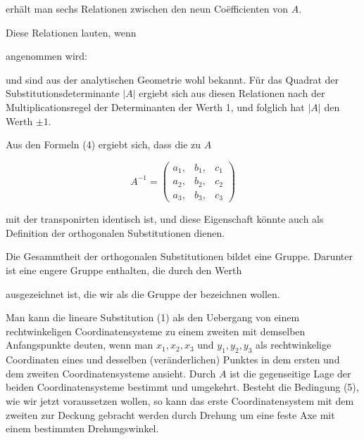 erh\"alt man sechs Relationen zwischen den neun Coëfficienten
von $A$.

Diese Relationen lauten, wenn


angenommen wird:


und sind aus der analytischen Geometrie wohl bekannt. F\"ur das
Quadrat der Substitutionsdeterminante $|A|$ ergiebt sich aus diesen
Relationen nach der Multiplicationsregel der Determinanten der
Werth 1, und folglich hat $|A|$ den Werth $\pm 1$.

Aus den Formeln (4) ergiebt sich, dass die  zu $A$

\[
A^{-1} = \begin{pmatrix} a_1, & b_1, & c_1\\ a_2, & b_2, & c_2\\ a_3, & b_3, & c_3 \end{pmatrix}
\]

mit der transponirten identisch ist, und diese Eigenschaft k\"onnte
auch als Definition der orthogonalen Substitutionen dienen.

Die Gesammtheit der orthogonalen Substitutionen bildet
eine Gruppe. Darunter ist eine engere Gruppe enthalten, die
durch den Werth


ausgezeichnet ist, die wir als die Gruppe der  bezeichnen wollen.

Man kann die lineare Substitution (1) als den Uebergang
von einem rechtwinkeligen Coordinatensysteme zu einem zweiten
mit demselben Anfangspunkte deuten, wenn man $x_1, x_2, x_3$ und
$y_1, y_2, y_3$ als rechtwinkelige Coordinaten eines und desselben
(ver\"anderlichen) Punktes in dem ersten und dem zweiten Coordinatensysteme ansieht. Durch $A$ ist die gegenseitige Lage der
beiden Coordinatensysteme bestimmt und umgekehrt. Besteht
die Bedingung (5), wie wir jetzt voraussetzen wollen, so kann
das erste Coordinatensystem mit dem zweiten zur Deckung gebracht werden durch Drehung um eine feste Axe mit einem
bestimmten Drehungswinkel.

